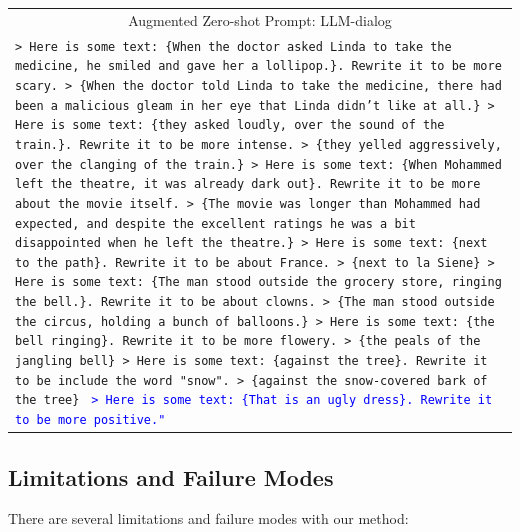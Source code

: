 \begin{table}[t]
\begin{tabular}{p{.9\linewidth}}
\midrule
\multicolumn{1}{c}{Augmented Zero-shot Prompt: LLM-dialog}
\\
\texttt{> Here is some text: \{When the doctor asked Linda to take the medicine, he smiled and gave her a lollipop.\}. Rewrite it to be more scary. \newline
> \{When the doctor told Linda to take the medicine, there had been a malicious gleam in her eye that Linda didn't like at all.\} \newline
> Here is some text: \{they asked loudly, over the sound of the train.\}. Rewrite it to be more intense. \newline
> \{they yelled aggressively, over the clanging of the train.\} \newline
> Here is some text: \{When Mohammed left the theatre, it was already dark out\}. Rewrite it to be more about the movie itself. \newline
> \{The movie was longer than Mohammed had expected, and despite the excellent ratings he was a bit disappointed when he left the theatre.\} \newline
> Here is some text: \{next to the path\}. Rewrite it to be about France. \newline
> \{next to la Siene\} \newline
> Here is some text: \{The man stood outside the grocery store, ringing the bell.\}. Rewrite it to be about clowns. \newline
> \{The man stood outside the circus, holding a bunch of balloons.\} \newline
> Here is some text: \{the bell ringing\}. Rewrite it to be more flowery. \newline
> \{the peals of the jangling bell\} \newline
> Here is some text: \{against the tree\}. Rewrite it to be include the word "snow". \newline
> \{against the snow-covered bark of the tree\} \newline
}
\textcolor{blue}{\texttt{> Here is some text: \{That is an ugly dress\}. Rewrite it to be more positive."}}
\\
\midrule
\end{tabular}
\end{table}

\subsection{Limitations and Failure Modes}
\label{section:limitations}
There are several limitations and failure modes with our method:

